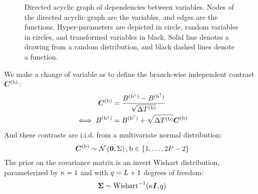 \begin{figure}[H]
	\caption[Directed acyclic graph of dependencies between variables]{
	Directed acyclic graph of dependencies between variables.
	Nodes of the directed acyclic graph are the variables, and edges are the functions.
	Hyper-parameters are depicted in {\color{RED}{red}} circle, random variables in {\color{BLUE}{blue}} circles, and transformed variables in black.
	Solid {\color{BLUE}{blue}} line denotes a drawing from a random distribution, and black dashed lines denote a function.
}
	\label{fig:graph}%
\end{figure}

We make a change of variable as to define the branch-wise independent contrast $\bm{C}^{(\text{b})}$:
\begin{align}
\contrast\branchexp &= \dfrac{\brownian^{(\nodeDown)} - \brownian^{(\nodeUp)}}{\sqrt{\branchtime\branchexp}} \\
\label{eq:independent_contrast}
\iff \brownian^{(\nodeDown)} &= \brownian^{(\nodeUp)} + \sqrt{\branchtime\branchexp}\contrast\branchexp 
\end{align}
And these contrasts are i.i.d.
from a multivariate normal distribution:
\begin{equation}
\label{eq:Distribcontrast}
\contrast\branchexp \sim \mathcal{N}\left(\bm{0}, \Covariancematrix \right), \Setbranch
\end{equation}
The prior on the covariance matrix is an invert Wishart distribution, parameterized by $\kappa=1$ and with $q=L + 1$ degrees of freedom:
\begin{equation}
\label{eq:Distribcovariance}
\CovarianceMatrix \sim \mathrm{Wishart}^{-1} (\covariancekappa \Identitymatrix, \covariancedf)
\end{equation}

